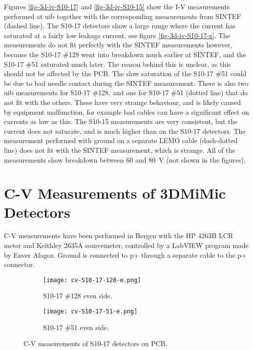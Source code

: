 \documentclass[../main/thesis.tex]{subfiles}
\begin{document}
Figures \ref{fig-3d-iv-S10-17} and \ref{fig-3d-iv-S10-15} show the I-V measurements performed at \gls{uib} together with the corresponding measurements from SINTEF (dashed line). The S10-17 detectors show a large range where the current has saturated at a fairly low leakage current, see figure \ref{fig-3d-iv-S10-17-z}. The measurements do not fit perfectly with the SINTEF measurements however, because the S10-17 \#128 went into breakdown much earlier at SINTEF, and the S10-17 \#51 saturated much later. The reason behind this is unclear, as this should not be affected by the \gls{PCB}. The slow saturation of the S10-17 \#51 could be due to bad needle contact during the SINTEF measurement. There is also two \gls{uib} measurements for S10-17 \#128, and one for S10-17 \#51 (dotted line) that do not fit with the others. These have very strange behaviour, and is likely caused by equipment malfunction, for example bad cables can have a significant effect on currents as low as this. The S10-15 measurements are very consistent, but the current does not saturate, and is much higher than on the S10-17 detectors. The measurement performed with ground on a separate LEMO cable (dash-dotted line) does not fit with the SINTEF measurement, which is strange. All of the measurements show breakdown between 60 and 80~V (not shown in the figures). 


\section{C-V Measurements of 3DMiMic Detectors}

C-V measurements have been performed in Bergen with the HP 4263B LCR meter and Keithley 2635A sourcemeter, controlled by a LabVIEW program made by Enver Alagoz. Ground is connected to p+ through a separate cable to the p+ connector. 

\begin{figure}
	\centering
	\begin{subfigure}{.5\textwidth}
		\centering
		\texttt{[image: cv-S10-17-128-e.png]}
		\caption{S10-17 \#128 even side.}
		\label{fig-cv-S10-17-128-e}
	\end{subfigure}%
	\begin{subfigure}{.5\textwidth}
		\centering
		\texttt{[image: cv-S10-17-51-e.png]}
		\caption{S10-17 \#51 even side.}
		\label{fig-cv-S10-17-51-e} 
	\end{subfigure}
	\caption{C-V measurements of S10-17 detectors on PCB.}
	\label{fig-3d-cv-S10-17}
\end{figure}
\end{document}
